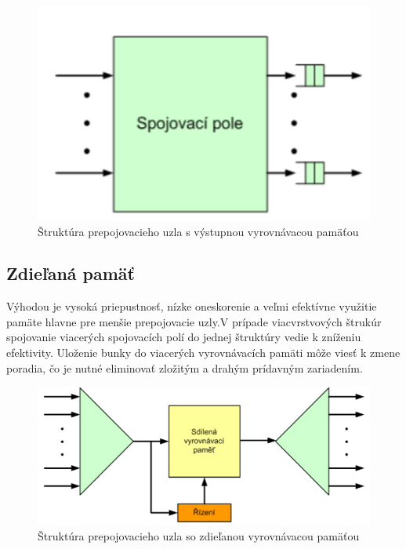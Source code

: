 \begin{figure}[ht]
\centering
  \begin{center}
    \includegraphics[scale=0.8]{BPC-HWS/images/propoj_vystup.png}
  \end{center}
  \caption[Štruktúra prepojovacieho uzla s výstupnou vyrovnávacou pamäťou]{Štruktúra prepojovacieho uzla s výstupnou vyrovnávacou pamäťou}
\end{figure}

\subsection{Zdieľaná pamäť}
Výhodou je vysoká priepustnosť, nízke oneskorenie a veľmi efektívne využitie pamäte hlavne pre menšie prepojovacie uzly.V prípade viacvrstvových štrukúr spojovanie viacerých spojovacích polí do jednej štruktúry vedie k zníženiu efektivity. Uloženie bunky do viacerých vyrovnávacích pamäti môže viesť k zmene poradia, čo je nutné eliminovať zložitým a drahým prídavným zariadením.

\begin{figure}[ht]
\centering
  \begin{center}
    \includegraphics[scale=0.8]{BPC-HWS/images/propoj_zdiel.png}
  \end{center}
  \caption[Štruktúra prepojovacieho uzla so zdieľanou vyrovnávacou pamäťou]{Štruktúra prepojovacieho uzla so zdieľanou vyrovnávacou pamäťou}
\end{figure}

